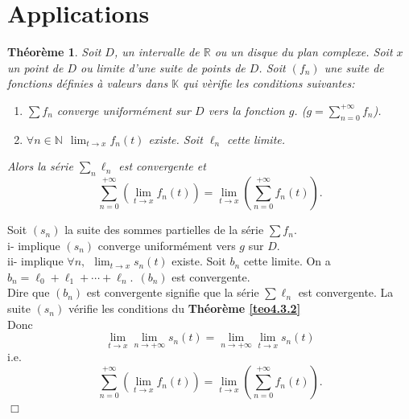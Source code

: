 \documentclass[11pt, a4paper]{book}
\newtheorem{teo}{Th\'eor\`eme}[section]
\newenvironment{pr}{\noindent {\bf Preuve} \noindent} {\hfill $\Box$\vskip 5mm}
\begin{document}
\section{Applications}
\begin{teo} \label{teo4.4.1} Soit $D$, un intervalle de $\mathbb{R}$ ou un disque du plan complexe. Soit $x$ un point de $D$ ou limite d'une suite de points de $D$. Soit $(f_n)$ une suite de fonctions d\'efinies \`a valeurs dans $\mathbb{K}$ qui v\`erifie les conditions suivantes:
\begin{enumerate}
\item[i-] $\sum f_n$ converge uniform\'ement sur $D$ vers la fonction $g$. (${\displaystyle g= \sum_{n=0}^{+\infty} f_n}$).
\item[ii-] $\forall n\in \mathbb{N} ~~{\displaystyle \lim_{t\rightarrow x} f_n (t)}$ existe. Soit $\ell_n$ cette limite. 
\end{enumerate}
Alors la s\'erie $\sum_n \ell_n $ est convergente et $$ \sum_{n=0}^{+\infty} \left( \lim_{t\rightarrow x} f_n (t)\right)=\lim_{t\rightarrow x} \left(\sum_{n=0}^{+\infty} f_n(t)\right).$$
\end{teo}
\begin{pr}\quad

Soit $(s_n)$ la suite des sommes partielles de la s\'erie $\sum f_n$.\\
i- implique $(s_n)$ converge uniform\'ement vers $g$ sur $D$.\\
ii- implique $\forall n,~~{\displaystyle \lim_{t\rightarrow x}s_n(t)}$ existe. Soit $b_n$ cette limite. On a $b_n=\ell_0+\ell_1+\cdots+\ell_n.~~(b_n)$ est convergente. \\
Dire que $(b_n)$ est convergente signifie que la s\'erie $\sum \ell_n$ est convergente. La suite $(s_n)$ v\'erifie les conditions du \textbf{Th\'eor\`eme \ref{teo4.3.2}}\\
Donc $$ \lim_{t\rightarrow x}\lim_{n\rightarrow+\infty}s_n(t)=\lim_{n\rightarrow+\infty}\lim_{t\rightarrow x}s_n(t)$$ i.e. $$ \sum_{n=0}^{+\infty} \left( \lim_{t\rightarrow x} f_n (t)\right)=\lim_{t\rightarrow x} \left(\sum_{n=0}^{+\infty} f_n(t)\right).$$
\end{pr}
\end{document}
